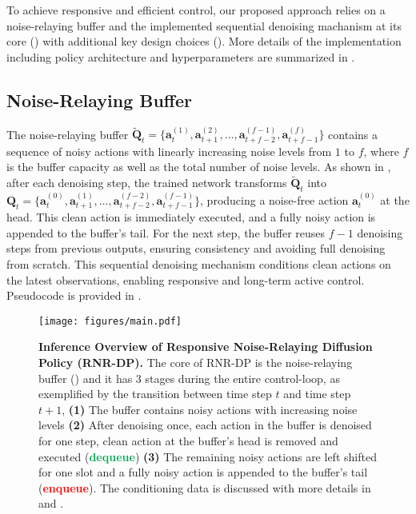 To achieve responsive and efficient control, our proposed approach relies on a noise-relaying buffer and the implemented sequential denoising machanism at its core () with additional key design choices (). More details of the implementation including policy architecture and hyperparameters are summarized in .

\subsection{Noise-Relaying Buffer}
\label{sec:noise_relaying_buffer}

The noise-relaying buffer \(\mathbf{\tilde{Q}}_t = \{ \mathbf{a}_{t}^{(1)}, \mathbf{a}_{t+1}^{(2)}, \dots, \mathbf{a}_{t+f-2}^{(f-1)}, \mathbf{a}_{t+f-1}^{(f)} \}\) contains a sequence of noisy actions with linearly increasing noise levels from \(1\) to \(f\), where \(f\) is the buffer capacity as well as the total number of noise levels. As shown in , after each denoising step, the trained network transforms \(\mathbf{\tilde{Q}}_t\) into \(\mathbf{Q}_t = \{ \mathbf{a}_{t}^{(0)}, \mathbf{a}_{t+1}^{(1)}, \dots, \mathbf{a}_{t+f-2}^{(f-2)}, \mathbf{a}_{t+f-1}^{(f-1)} \}\), producing a noise-free action \(\mathbf{a}_t^{(0)}\) at the head. This clean action is immediately executed, and a fully noisy action is appended to the buffer's tail. For the next step, the buffer reuses \(f-1\) denoising steps from previous outputs, ensuring consistency and avoiding full denoising from scratch. This sequential denoising mechanism conditions clean actions on the latest observations, enabling responsive and long-term active control. Pseudocode is provided in .

\begin{figure*}[t]
    \centering
    \texttt{[image: figures/main.pdf]}
    \caption{
    \textbf{Inference Overview of Responsive Noise-Relaying Diffusion Policy (RNR-DP).}
    The core of RNR-DP is the noise-relaying buffer () and it has 3 stages during the entire control-loop, as exemplified by the transition between time step \(t\) and time step \(t+1\), \textbf{(1)} The buffer contains noisy actions with increasing noise levels \textbf{(2)} After denoising once, each action in the buffer is denoised for one step, clean action at the buffer's head is removed and executed (\textbf{\textcolor[HTML]{00A651}{dequeue}}) \textbf{(3)} The remaining noisy actions are left shifted for one slot and a fully noisy action is appended to the buffer's tail (\textbf{\textcolor{red}{enqueue}}).
    The conditioning data is discussed with more details in  and .
    }
    \vspace{-8pt}
    \label{fig:inference_overview}
\end{figure*}


